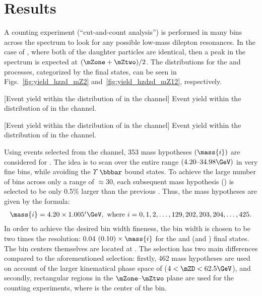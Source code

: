 \section{Results}
\label{sec:results_dilep}
A counting experiment (``cut-and-count analysis'') is performed in many bins across the \mZtwo spectrum to look for any possible low-mass dilepton resonances.
In the case of \htozdzd, where both of the daughter particles are identical, then a peak in the \mZtwo spectrum is expected at $(\mZone + \mZtwo) / 2$.
The \mZtwo distributions for the \htozzd and \htozdzd processes, categorized by the \mZtwo final states, can be seen in Figs.~\ref{fig:yield_hzzd_mZ2} and~\ref{fig:yield_hzdzd_mZ12}, respectively.
\begin{multiFigure}
    \centering
        [Event yield within the distribution of \mZtwo in the \htozzd channel]
        {Event yield within the distribution of \mZtwo in the \htozzd channel.}
    \label{fig:yield_hzzd_mZ2}
\end{multiFigure}
\begin{multiFigure}
    \centering
        [Event yield within the distribution of \mZtwo in the \htozdzd channel]
        {Event yield within the distribution of \mZtwo in the \htozdzd channel.}
    \label{fig:yield_hzdzd_mZ12}
\end{multiFigure}

Using events selected from the \htozzd channel, 353 mass hypotheses $\left( \mass{i} \right)$ are considered for \mZtwo.
The idea is to scan over the entire \mZtwo range $(4.20\text{--}34.98 \GeV)$ in very fine \mZtwo bins, while avoiding the $\varUpsilon$ $\bbbar$ bound states.  %
To achieve the large number of bins across only a range of $\approx$30\GeV, each subsequent mass hypothesis () is selected to be only 0.5\% larger than the previous .
Thus, the mass hypotheses are given by the formula:
\begin{align*}
    \mass{i} = 4.20 \times 1.005^{i} \GeV,
    \text{ where } i = 0,1,2, \ldots, 129, 202, 203, 204, \ldots, 425.
\end{align*}
In order to achieve the desired bin width fineness, the bin width is chosen to be two times the \mZtwo resolution:
0.04 $(0.10) \times \mass{i}$ for the \fourmu and \twoetwomu (\foure and \twomutwoe) final states.
The bin centers themselves are located at .
The \zdzd selection has two main differences compared to the aforementioned \zzd selection:
firstly, 462 mass hypotheses are used on account of the larger kinematical phase space of \mZtwo ($4 < \mZD < 62.5\GeV$),
and secondly, rectangular regions in the $\mZone \text{--} \mZtwo$ plane are used for the counting experiments, where  is the center of the bin.

